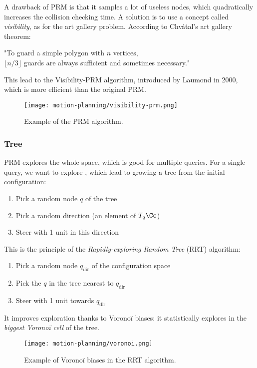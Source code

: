 A drawback of PRM is that it samples a lot of useless nodes, which quadratically increases the collision checking time. A solution is to use a concept called \emph{visibility}, as for the art gallery problem. According to Chvátal's art gallery theorem:
\begin{center}
    "To guard a simple polygon with $n$ vertices,\\ $\lfloor n/3\rfloor$ guards are always sufficient and sometimes necessary."
\end{center}
This lead to the Visibility-PRM algorithm, introduced by Laumond in 2000, which is more efficient than the original PRM.
\begin{figure}[H]
    \centering
    \texttt{[image: motion-planning/visibility-prm.png]}
    \caption{Example of the PRM algorithm.}
\end{figure}

\subsubsection{Tree}
PRM explores the whole space, which is good for multiple queries. For a single query, we want to explore , which lead to growing a tree from the initial configuration:
\begin{enumerate}
    \item Pick a random node $q$ of the tree
    \item Pick a random direction (an element of $T_q\Cc$)
    \item Steer with 1 unit in this direction
\end{enumerate}
This is the principle of the \emph{Rapidly-exploring Random Tree} (RRT) algorithm:
\begin{enumerate}
    \item Pick a random node $q_{\text{dir}}$ of the configuration space
    \item Pick the $q$ in the tree nearest to $q_{\text{dir}}$
    \item Steer with 1 unit towards $q_{\text{dir}}$
\end{enumerate}
It improves exploration thanks to Voronoï biases: it statistically explores in the \emph{biggest Voronoï cell} of the tree.
\begin{figure}[H]
    \centering
    \texttt{[image: motion-planning/voronoi.png]}
    \caption{Example of Voronoï biases in the RRT algorithm.}
\end{figure}

